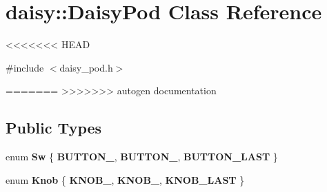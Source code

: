 \hypertarget{classdaisy_1_1_daisy_pod}{}\section{daisy\+:\+:Daisy\+Pod Class Reference}
\label{classdaisy_1_1_daisy_pod}
<<<<<<< HEAD


{\ttfamily \#include $<$daisy\+\_\+pod.\+h$>$}

=======
>>>>>>> autogen documentation
\subsection*{Public Types}
\begin{DoxyCompactItemize}
\item 
\mbox{\label{classdaisy_1_1_daisy_pod_a148bfabd288f0b4d20a26b1d0e3bdeeb}} 
enum {\bfseries Sw} \{ {\bfseries B\+U\+T\+T\+O\+N\+\_}, 
{\bfseries B\+U\+T\+T\+O\+N\+\_}, 
{\bfseries B\+U\+T\+T\+O\+N\+\_\+\+L\+A\+ST}
 \}
\item 
\mbox{\label{classdaisy_1_1_daisy_pod_a43462bcc3a3d5167a383a5eda489878f}} 
enum {\bfseries Knob} \{ {\bfseries K\+N\+O\+B\+\_}, 
{\bfseries K\+N\+O\+B\+\_}, 
{\bfseries K\+N\+O\+B\+\_\+\+L\+A\+ST}
 \}
\end{DoxyCompactItemize}
